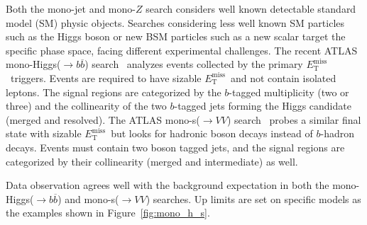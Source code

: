 \documentclass{moriond}
\def\et{E_\mathrm{T}^{\mathrm{miss}}}
\begin{document}
Both the mono-jet and mono-$Z$ search considers well known detectable standard
model (SM) physic objects. Searches considering less well known SM particles
such as the Higgs boson or new BSM particles such as a new scalar target the
specific phase space, facing different experimental challenges. The recent
ATLAS mono-Higgs($\rightarrow b\overline{b}$) search~\cite{monoh} analyzes
events collected by the primary $\et$\ triggers. Events are required to have
sizable $\et$\ and not contain isolated leptons. The signal regions are categorized by
the $b$-tagged multiplicity (two or three) and the collinearity of the two
$b$-tagged jets forming the Higgs candidate (merged and resolved). The ATLAS
mono-s($\rightarrow VV$) search~\cite{monos} probes a similar final state with
sizable $\et$\ but looks for hadronic boson decays instead of $b$-hadron
decays. Events must contain two boson tagged jets, and the signal regions are
categorized by their collinearity (merged and intermediate) as well. 

Data observation agrees well with the background expectation in both the mono-Higgs($\rightarrow b\overline{b}$) and mono-s($\rightarrow VV$) searches. Up limits are set on specific models as the examples shown in Figure~\ref{fig:mono_h_s}.      
\end{document}
